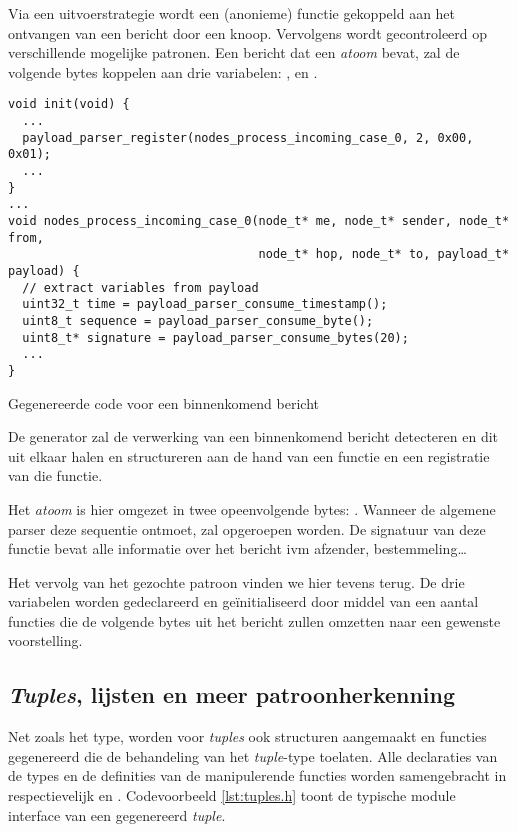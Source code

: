 Via een uitvoerstrategie wordt een (anonieme) functie gekoppeld aan het
ontvangen van een bericht door een knoop. Vervolgens wordt gecontroleerd op
verschillende mogelijke patronen. Een bericht dat een 
\emph{atoom} bevat, zal de volgende bytes koppelen aan drie variabelen:
,  en .

\begin{listing}[ht]
  \begin{verbatim}
void init(void) {
  ...
  payload_parser_register(nodes_process_incoming_case_0, 2, 0x00, 0x01);
  ...
}
...
void nodes_process_incoming_case_0(node_t* me, node_t* sender, node_t* from,
                                   node_t* hop, node_t* to, payload_t* payload) {
  // extract variables from payload
  uint32_t time = payload_parser_consume_timestamp();
  uint8_t sequence = payload_parser_consume_byte();
  uint8_t* signature = payload_parser_consume_bytes(20);
  ...
}
  \end{verbatim}
  \vspace{-5mm}
  \caption{Gegenereerde code voor een binnenkomend bericht}
  \label{lst:comm.c}
\end{listing}

De generator zal de verwerking van een binnenkomend bericht detecteren en dit
uit elkaar halen en structureren aan de hand van een functie en een registratie
van die functie.

Het \emph{atoom} is hier omgezet in twee opeenvolgende bytes: .
Wanneer de algemene parser deze sequentie ontmoet, zal
 opgeroepen worden. De signatuur van
deze functie bevat alle informatie over het bericht ivm afzender,
bestemmeling\dots

Het vervolg van het gezochte patroon vinden we hier tevens terug. De drie
variabelen worden gedeclareerd en ge\"initialiseerd door middel van een aantal
functies die de volgende bytes uit het bericht zullen omzetten naar een
gewenste voorstelling.

\subsection{\emph{Tuples}, lijsten en meer patroonherkenning}

Net zoals het  type, worden voor \emph{tuples} ook structuren
aangemaakt en functies gegenereerd die de behandeling van het \emph{tuple}-type
toelaten. Alle declaraties van de types en de definities van de manipulerende
functies worden samengebracht in respectievelijk  en
. Codevoorbeeld \ref{lst:tuples.h} toont de typische module
interface van een gegenereerd \emph{tuple}.

